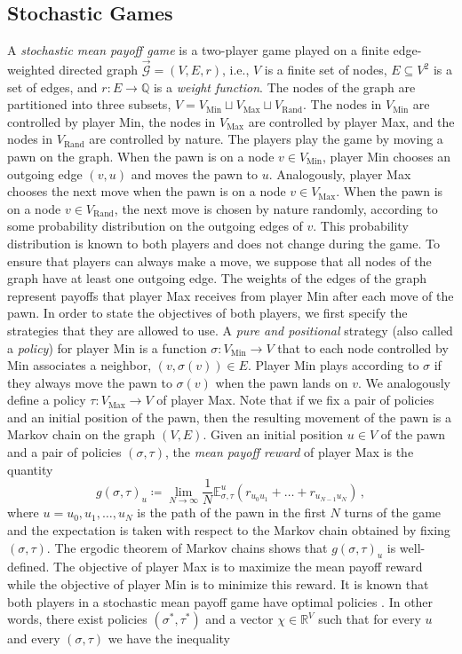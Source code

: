 \documentclass[11pt]{article}
\theoremstyle{definition}
\theoremstyle{remark}
\newcommand{\R}{\mathbb{R}}
\newcommand{\dgraph}{\vec{\mathcal{G}}}
\newcommand{\vertices}{V}
\newcommand{\Max}{\mathrm{Max}}
\newcommand{\Min}{\mathrm{Min}}
\newcommand{\Rand}{\mathrm{Rand}}
\newcommand{\Maxvertices}{\vertices_{\Max}}
\newcommand{\Minvertices}{\vertices_{\Min}}
\newcommand{\Randvertices}{\vertices_{\Rand}}
\newcommand{\payoff}{r}
\begin{document}
\subsection{Stochastic Games}
\label{sect:SG}
A \emph{stochastic mean payoff game} is a two-player game played on a finite edge-weighted directed graph $\dgraph = (V,E,\payoff)$, i.e., $V$ is a finite set of nodes, $E \subseteq V^2$ is a set of edges, and $r \colon E \to {\mathbb Q}$ is a \emph{weight function}. 
The nodes of the graph are partitioned into three subsets, $V = \Minvertices \sqcup \Maxvertices \sqcup \Randvertices$. The nodes in $\Minvertices$ are controlled by player Min, the nodes in $\Maxvertices$ are controlled by player Max, and the nodes in $\Randvertices$ are controlled by nature. The players play the game by moving a pawn on the graph. When the pawn is on a node $v \in \Minvertices$, player Min chooses an outgoing edge $(v,u)$ and moves the pawn to $u$. Analogously, player Max chooses the next move when the pawn is on a node $v \in \Maxvertices$. When the pawn is on a node $v \in \Randvertices$, the next move is chosen by nature randomly, according to some probability distribution on the outgoing edges of $v$. This probability distribution is known to both players and does not change during the game. To ensure that players can always make a move, we suppose that all nodes of the graph have at least one outgoing edge. The weights of the edges of the graph represent payoffs that player Max receives from player Min after each move of the pawn. 
In order to state the objectives of both players, we first specify the strategies that they are allowed to use. A \emph{pure and positional} strategy (also called a \emph{policy}) for player Min is a function $\sigma \colon \Minvertices \to V$ that to each node controlled by Min associates a neighbor, $(v,\sigma(v)) \in E$. Player Min plays according to $\sigma$ if they always move the pawn to $\sigma(v)$ when the pawn lands on $v$. We analogously define a policy $\tau \colon \Maxvertices \to V$ of player Max. Note that if we fix a pair of policies and an initial position of the pawn, then the resulting movement of the pawn is a Markov chain on the graph $(V,E)$. Given an initial position $u \in V$ of the pawn and a pair of policies $(\sigma,\tau)$, the \emph{mean payoff reward} of player Max is the quantity
\[
g(\sigma,\tau)_u \coloneqq \lim_{N \to \infty} \frac{1}{N}\mathbb{E}^u_{\sigma,\tau}(\payoff_{u_0u_1} + \dots + \payoff_{u_{N-1}u_{N}}) \, ,
\]
where $u = u_0, u_1, \dots, u_N$ is the path of the pawn in the first $N$ turns of the game and the expectation is taken with respect to the Markov chain obtained by fixing $(\sigma,\tau)$. The ergodic theorem of Markov chains shows that $g(\sigma,\tau)_u$ is well-defined. The objective of player Max is to maximize the mean payoff reward while the objective of player Min is to minimize this reward. It is known that both players in a stochastic mean payoff game have optimal policies \cite{liggett_lippman}. In other words, there exist policies $(\sigma^*,\tau^*)$ and a vector $\chi \in \R^{\vertices}$ such that for every $u$ and every $(\sigma,\tau)$ we have the inequality
\end{document}
